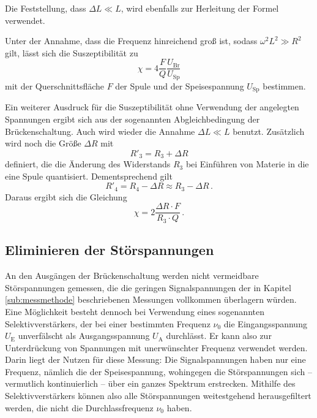     Die Feststellung, dass $\Delta L \ll L$, wird ebenfalls zur Herleitung der Formel verwendet. 

    Unter der Annahme, dass die Frequenz hinreichend groß ist, sodass $\omega^2L^2\gg R^2$ gilt, lässt sich die Suszeptibilität
    zu 
    \begin{equation}
        \chi =4\frac{F}{Q}\frac{U_\text{Br}}{U_\text{Sp}}
        \label{eqn:hatschi}
    \end{equation}
    mit der Querschnittsfläche $F$ der Spule und der Speisespannung $U_\text{Sp}$ bestimmen\cite{Versuchsanleitung}.

    Ein weiterer Ausdruck für die Suszeptibilität ohne Verwendung der angelegten Spannungen ergibt sich aus der 
    sogenannten Abgleichbedingung  der Brückenschaltung. Auch wird wieder die Annahme $\Delta L \ll L$ benutzt. 
    Zusätzlich wird noch die Größe $\Delta R$ mit 
    \begin{equation*}
        R'_3=R_3 +\Delta R
    \end{equation*}
    definiert, die die Änderung des Widerstands $R_3$ bei Einführen von Materie in die eine Spule quantisiert.
    Dementsprechend gilt 
    \begin{equation*}
        R'_4=R_4-\Delta R \approx R_3 - \Delta R\,.
    \end{equation*}
    Daraus ergibt sich die Gleichung\cite{Versuchsanleitung}
    \begin{equation}
        \chi = 2 \frac{\Delta R \cdot F}{R_3 \cdot Q}\,.
        \label{eqn:chii2}
    \end{equation}

\subsection{Eliminieren der Störspannungen}

    An den Ausgängen der Brückenschaltung werden nicht vermeidbare Störspannungen gemessen, die die geringen Signalspannungen 
    der in Kapitel \ref{sub:messmethode} beschriebenen Messungen vollkommen überlagern würden. 
    Eine Möglichkeit besteht dennoch bei Verwendung eines sogenannten Selektivverstärkers, der bei einer bestimmten Frequenz $\nu _0$
    die Eingangsspannung $U_\text{E}$ unverfälscht als Ausgangsspannung $U_\text{A}$ durchlässt. 
    Er kann also zur Unterdrückung von Spannungen mit unerwünschter Frequenz verwendet werden. 
    Darin liegt der Nutzen für diese Messung: 
    Die Signalspannungen haben nur eine Frequenz, nämlich die der Speisespannung, wohingegen die Störspannungen sich -- 
    vermutlich kontinuierlich -- über ein ganzes Spektrum erstrecken. 
    Mithilfe des Selektivverstärkers können also alle Störspannungen weitestgehend herausgefiltert werden, die nicht die 
    Durchlassfrequenz $\nu _0$ haben. 

